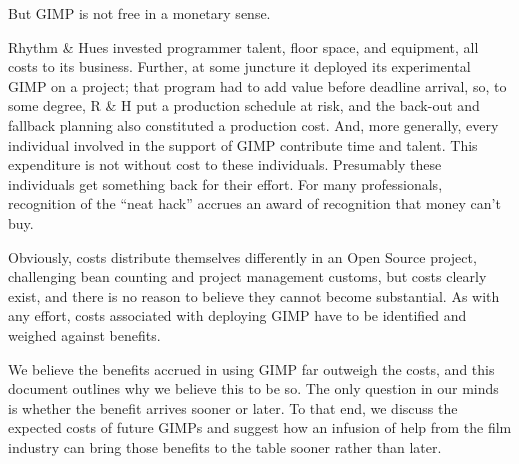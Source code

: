 But GIMP is not free in a monetary sense. 

Rhythm \& Hues invested programmer talent, floor space, and equipment,
all costs to its business. Further, at some juncture it deployed its
experimental GIMP on a project; that program had to add value before
deadline arrival, so, to some degree, R \& H put a production schedule
at risk, and the back-out and fallback planning also constituted a
production cost. And, more generally, every individual involved in the
support of GIMP contribute time and talent. This expenditure is not
without cost to these individuals. Presumably these individuals get
something back for their effort. For many professionals, recognition
of the ``neat hack'' accrues an award of recognition that money can't
buy. 

Obviously, costs distribute themselves differently in an Open Source
project, challenging bean counting and project management customs, but
costs clearly exist, and there is no reason to believe they cannot
become substantial. As with any effort, costs associated with
deploying GIMP have to be identified and weighed against benefits.

We believe the benefits accrued in using GIMP far outweigh the costs,
and this document outlines why we believe this to be so. The only
question in our minds is whether the benefit arrives sooner or
later. To that end, we discuss the expected costs of future GIMPs and
suggest how an infusion of help from the film industry can bring those
benefits to the table sooner rather than later.


